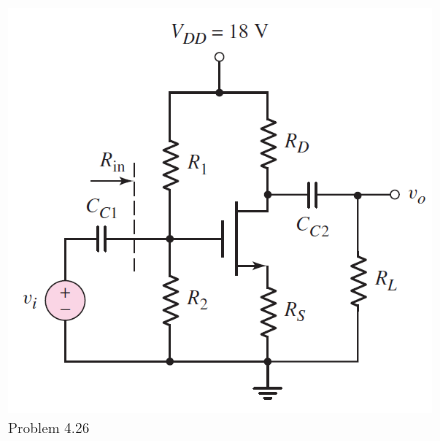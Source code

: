 \documentclass[a4paper,11pt,UTF8]{article}
\begin{document}
\begin{figure}[H] 
	\centering 
	\includegraphics[scale=0.5]{MD4.26.png}
	\caption{Problem 4.26}
\end{figure}
\end{document}
